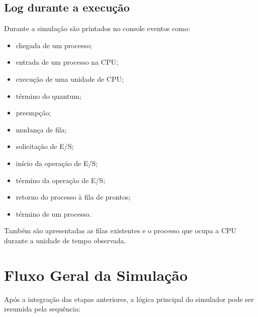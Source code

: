 \documentclass[12pt,a4paper]{article}
\begin{document}
\subsection{Log durante a execução}

Durante a simulação são printados no console eventos como:

\begin{itemize}

    \item chegada de um processo;

    \item entrada de um processo na CPU;

    \item execução de uma unidade de CPU;

    \item término do quantum;

    \item preempção;

    \item mudança de fila;

    \item solicitação de E/S;

    \item início da operação de E/S;

    \item término da operação de E/S;

    \item retorno do processo à fila de prontos;

    \item término de um processo.

\end{itemize}

Também são apresentadas as filas existentes e o processo que ocupa a
CPU durante a unidade de tempo observada.



\section{Fluxo Geral da Simulação}

Após a integração das etapas anteriores, a lógica principal do
simulador pode ser resumida pela sequência:
\end{document}
